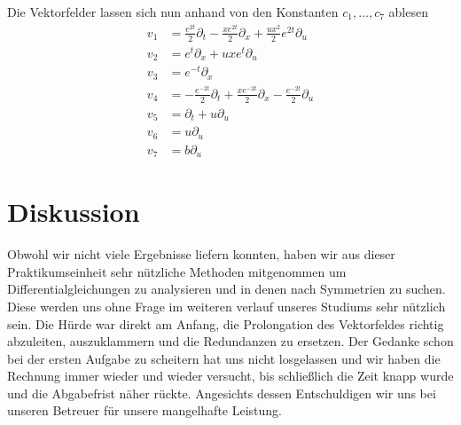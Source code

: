 \documentclass[a4paper]{article}
\begin{document}
Die Vektorfelder lassen sich nun anhand von den Konstanten $c_1,\dots,c_7$
ablesen
\begin{align}
    v_1 &= \frac{e^{2t}}{2} \partial_t - \frac{xe^{2t}}{2}\partial_x
    +\frac{ux^2}{2} e^{2t} \partial_u\\
    v_2 &=  e^t \partial_x +uxe^t \partial_u\\
    v_3 &= e^{-t}\partial_x\\
    v_4 &= -\frac{e^{-2t}}{2}\partial_t +\frac{xe^{-2t}}{2} \partial_x
    -\frac{e^{-2t}}{2}\partial_u\\
    v_5 &= \partial_t + u\partial_u\\
    v_6 &= u\partial_u\\
    v_7 &= b\partial_u
\end{align}





\section{Diskussion}
Obwohl wir nicht viele Ergebnisse liefern konnten, haben wir aus dieser
Praktikumseinheit sehr nützliche Methoden mitgenommen um
Differentialgleichungen zu analysieren und in denen nach Symmetrien zu
suchen. Diese werden uns ohne Frage im weiteren verlauf unseres Studiums sehr
nützlich sein. Die Hürde war direkt am Anfang, die Prolongation des
Vektorfeldes richtig abzuleiten, auszuklammern und die Redundanzen zu
ersetzen. Der Gedanke schon bei der ersten Aufgabe zu scheitern hat uns nicht
losgelassen und wir haben die Rechnung immer wieder und wieder versucht, bis
schließlich die Zeit knapp wurde und die Abgabefrist näher rückte.
Angesichts dessen Entschuldigen wir uns bei unseren Betreuer für unsere
mangelhafte Leistung.

\nocite{diffg}
\printbibliography
\end{document}
